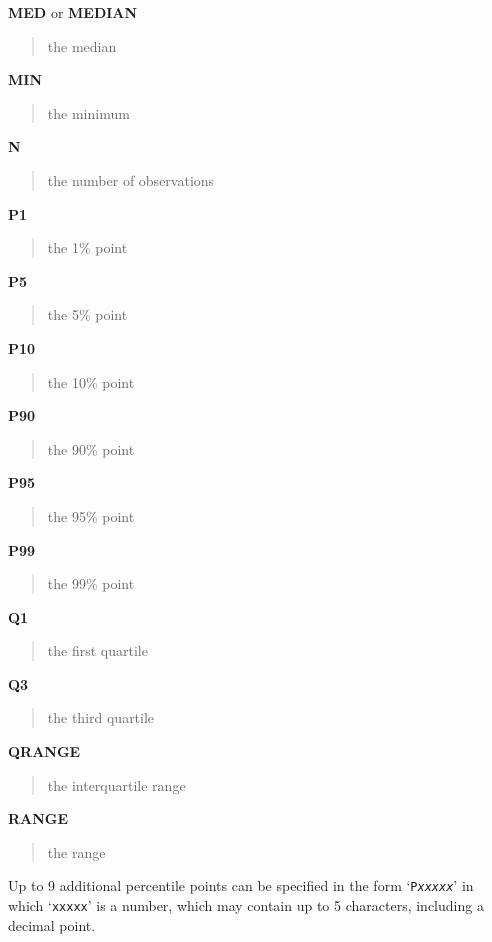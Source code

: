 \documentclass{book}
\newcommand\Texinfocommandstyletextvar[1]{{\normalfont{}\textsl{#1}}}%
\renewcommand{\_}{\Texinfounderscore\discretionary{}{}{}}
\begin{document}
\textbf{MED} or \textbf{MEDIAN}
\begin{quote}
the median
\end{quote}
%

\textbf{MIN}
\begin{quote}
the minimum
\end{quote}
%

\textbf{N}
\begin{quote}
the number of observations
\end{quote}
%

\textbf{P1}
\begin{quote}
the 1\% point
\end{quote}

\textbf{P5}
\begin{quote}
the 5\% point
\end{quote}

\textbf{P10}
\begin{quote}
the 10\% point
\end{quote}

\textbf{P90}
\begin{quote}
the 90\% point
\end{quote}

\textbf{P95}
\begin{quote}
the 95\% point
\end{quote}

\textbf{P99}
\begin{quote}
the 99\% point
\end{quote}

\textbf{Q1}
\begin{quote}
the first quartile
\end{quote}
%

\textbf{Q3}
\begin{quote}
the third quartile
\end{quote}
%

\textbf{QRANGE}
\begin{quote}
the interquartile range
\end{quote}
%

\textbf{RANGE}
\begin{quote}
the range
\end{quote}
%

Up to 9 additional percentile points
%
can be specified in the form `\texttt{P\Texinfocommandstyletextvar{xxxxx}}'
in which `\texttt{xxxxx}'
is a number, which may contain up to 5 characters, including a decimal point.
\end{document}
